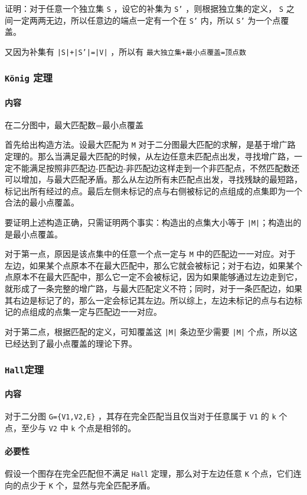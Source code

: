 \documentclass[UTF-8]{ctexart}
\begin{document}
	证明：对于任意一个独立集 \texttt{S} ，设它的补集为 \texttt{S'} ，则根据独立集的定义， \texttt{S} 之间一定两两无边，所以任意边的端点一定有一个在 \texttt{S'} 内，所以 \texttt{S'} 为一个点覆盖。
	
	又因为补集有 \texttt{|S|+|S'|=|V|} ，所以有 \texttt{最大独立集+最小点覆盖=顶点数}
	
	\subsubsection{\texttt{König} 定理}
	\paragraph{内容} 在二分图中，最大匹配数=最小点覆盖
	
	首先给出构造方法。设最大匹配为 \texttt{M} 对于二分图最大匹配的求解，是基于增广路定理的。那么当满足最大匹配的时候，从左边任意未匹配点出发，寻找增广路，一定不能满足按照非匹配边-匹配边-非匹配边这样走到一个非匹配点，不然匹配数还可以增加，与最大匹配矛盾。那么从左边所有未匹配点出发，寻找残缺的最短路，标记出所有经过的点。最后左侧未标记的点与右侧被标记的点组成的点集即为一个合法的最小点覆盖。
	
	要证明上述构造正确，只需证明两个事实：构造出的点集大小等于 \texttt{|M|}；构造出的是最小点覆盖。
	
	对于第一点，原因是该点集中的任意一个点一定与 \texttt{M} 中的匹配边一一对应。对于左边，如果某个点原本不在最大匹配中，那么它就会被标记；对于右边，如果某个点原本不在最大匹配中，那么它一定不会被标记，因为如果能够通过左边走到它，就形成了一条完整的增广路，与最大匹配定义不符；同时，对于一条匹配边，如果其右边是标记了的，那么一定会标记其左边。所以综上，左边未标记的点与右边标记的点组成的点集一定与匹配边一一对应。
	
	对于第二点，根据匹配的定义，可知覆盖这 \texttt{|M|} 条边至少需要 \texttt{|M|} 个点，所以这已经达到了最小点覆盖的理论下界。
	
	\subsubsection{\texttt{Hall}定理}
	\paragraph{内容} 对于二分图 \texttt{G=\{V1,V2,E\}} ，其存在完全匹配当且仅当对于任意属于 \texttt{V1} 的 \texttt{k} 个点，至少与 \texttt{V2} 中 \texttt{k} 个点是相邻的。
	
	\paragraph{必要性} 假设一个图存在完全匹配但不满足 \texttt{Hall} 定理，那么对于左边任意 \texttt{K} 个点，它们连向的点少于 \texttt{K} 个，显然与完全匹配矛盾。
	
\end{document}
